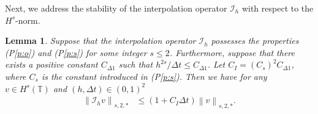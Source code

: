 \documentclass[10pt,a4paper,tbtags,leqno]{amsart}
\newtheorem{lemma}[theorem]{Lemma}
\theoremstyle{definition}
\numberwithin{equation}{section}
\def\norm#1#2{\left\|#2\right\|_{#1}}
\begin{document}
Next, we address the stability of the interpolation operator $ \mathcal{I}_{h} $ with respect to the $ H^s $-norm. 

\begin{lemma} \label{lem:2} 
  Suppose that the interpolation operator $ \mathcal{I}_{h} $ possesses the properties (P\ref{p:o}) and (P\ref{p:s}) for some integer $ s \leq 2 $. Furthermore, suppose that there exists a positive constant $ C_{\Delta 1} $ such that $ h^{2s} / \Delta t \leq C_{\Delta 1} $. Let $ C_I = (C_s)^2 C_{\Delta 1} $, where $ C_s $ is the constant introduced in (P\ref{p:s}). Then we have for any $ v \in H^s (\mathbb{T}) $ and $ (h, \Delta t) \in (0,1)^2 $
  \begin{align} 
    \norm{s, 2, *}{\mathcal{I}_{h} v} & \leq \left(1 + C_I \Delta t \right) \norm{s, 2, *}{v}. 
  \end{align} 
\end{lemma} 
\end{document}
